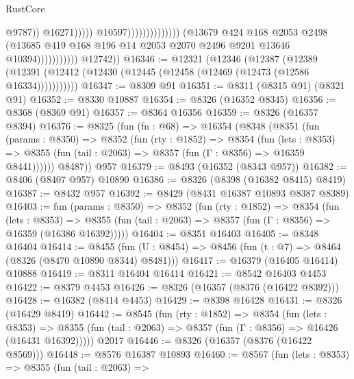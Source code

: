 \begin{lexlean}{RustCore}
\begin{coremodule}
                                                                    @9787))
                                                                @16271)))))
                                                      @10597))))))))))))))
                          (@13679
                            @424
                            @168
                            @2053
                            @2498
                            (@13685
                              @419
                              @168
                              @196
                              @14
                              @2053
                              @2070
                              @2496
                              @9201
                              @13646
                              @10394)))))))))))
        @12742))
@16346 := @12321
    (@12346
      (@12387
        (@12389 (@12391 (@12412 (@12430 (@12445 (@12458 (@12469 (@12473 (@12586 @16334)))))))))))
@16347 := @8309 @91
@16351 := @8311 (@8315 @91) (@8321 @91)
@16352 := @8330 @10887
@16354 := @8326 (@16352 @8345)
@16356 := @8368 (@8369 @91)
@16357 := @8364 @16356
@16359 := @8326 (@16357 @8394)
@16376 := @8325
    (fun (fn : @68) =>
    @16354
      (@8348
        (@8351
          (fun (params : @8350) =>
          @8352
            (fun (rty : @1852) =>
            @8354
              (fun (lets : @8353) =>
              @8355 (fun (tail : @2063) => @8357 (fun (Γ : @8356) => @16359 @8441))))))
        @8487))
    @957
@16379 := @8493 (@16352 (@8343 @957))
@16382 := @8406 (@8407 @957) @10890
@16386 := @8326 (@8398 (@16382 @8415) @8419)
@16387 := @8432 @957
@16392 := @8429 (@8431 @16387 @10893 @8387 @8389)
@16403 := fun (params : @8350) =>
  @8352
    (fun (rty : @1852) =>
    @8354
      (fun (lets : @8353) =>
      @8355 (fun (tail : @2063) => @8357 (fun (Γ : @8356) => @16359 (@16386 @16392)))))
@16404 := @8351 @16403
@16405 := @8348 @16404
@16414 := @8455
    (fun (U : @8454) => @8456 (fun (t : @7) => @8464 (@8326 (@8470 @10890 @8344) @8481)))
@16417 := @16379 (@16405 @16414) @10888
@16419 := @8311 @16404 @16414
@16421 := @8542 @16403 @4453
@16422 := @8379 @4453
@16426 := @8326 (@16357 (@8376 (@16422 @8392)))
@16428 := @16382 (@8414 @4453)
@16429 := @8398 @16428
@16431 := @8326 (@16429 @8419)
@16442 := @8545
    (fun (rty : @1852) =>
    @8354
      (fun (lets : @8353) =>
      @8355 (fun (tail : @2063) => @8357 (fun (Γ : @8356) => @16426 (@16431 @16392)))))
    @2017
@16446 := @8326 (@16357 (@8376 (@16422 @8569)))
@16448 := @8576 @16387 @10893
@16460 := @8567
    (fun (lets : @8353) =>
    @8355
      (fun (tail : @2063) =>

\end{coremodule}
\end{lexlean}
